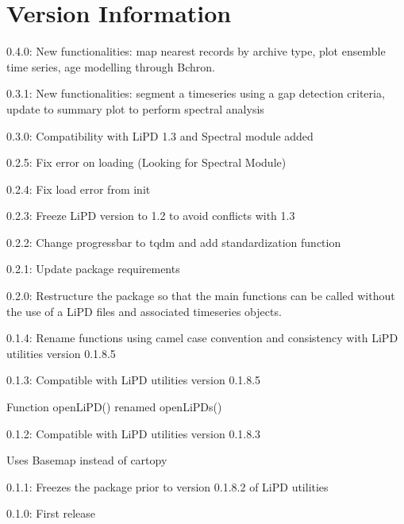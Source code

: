 \documentclass[letterpaper,10pt,english]{sphinxmanual}
\begin{document}
\section{Version Information}
\label{\detokenize{Introduction:version-information}}
\begin{DUlineblock}{0em}
\item[] 0.4.0: New functionalities: map nearest records by archive type, plot ensemble time series, age modelling through Bchron.
\item[] 0.3.1: New functionalities: segment a timeseries using a gap detection criteria, update to summary plot to perform spectral analysis
\item[] 0.3.0: Compatibility with LiPD 1.3 and Spectral module added
\item[] 0.2.5: Fix error on loading (Looking for Spectral Module)
\item[] 0.2.4: Fix load error from init
\item[] 0.2.3: Freeze LiPD version to 1.2 to avoid conflicts with 1.3
\item[] 0.2.2: Change progressbar to tqdm and add standardization function
\item[] 0.2.1: Update package requirements
\item[] 0.2.0: Restructure the package so that the main functions can be called without the use of a LiPD files and associated timeseries objects.
\item[] 0.1.4: Rename functions using camel case convention and consistency with LiPD utilities version 0.1.8.5
\item[] 0.1.3: Compatible with LiPD utilities version 0.1.8.5
\item[]
\begin{DUlineblock}{\DUlineblockindent}
\item[] Function openLiPD() renamed openLiPDs()
\end{DUlineblock}
\item[] 0.1.2: Compatible with LiPD utilities version 0.1.8.3
\item[]
\begin{DUlineblock}{\DUlineblockindent}
\item[] Uses Basemap instead of cartopy
\end{DUlineblock}
\item[] 0.1.1: Freezes the package prior to version 0.1.8.2 of LiPD utilities
\item[] 0.1.0: First release
\end{DUlineblock}
\end{document}
